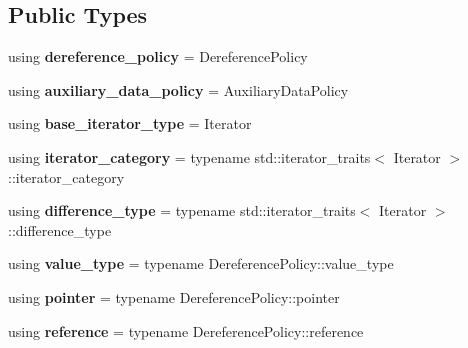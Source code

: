 \subsection*{Public Types}
\begin{DoxyCompactItemize}
\item 
\mbox{\label{classsequoia_1_1utilities_1_1iterator_ab53987191e27c9b1f33f4e916be8d9ef}} 
using {\bfseries dereference\+\_\+policy} = Dereference\+Policy
\item 
\mbox{\label{classsequoia_1_1utilities_1_1iterator_af01eea8a268f532dd72c984f17ed6c66}} 
using {\bfseries auxiliary\+\_\+data\+\_\+policy} = Auxiliary\+Data\+Policy
\item 
\mbox{\label{classsequoia_1_1utilities_1_1iterator_af167732549efba5d5db597e354ea22bc}} 
using {\bfseries base\+\_\+iterator\+\_\+type} = Iterator
\item 
\mbox{\label{classsequoia_1_1utilities_1_1iterator_a9cbb10816bfdac413573adf8802b2541}} 
using {\bfseries iterator\+\_\+category} = typename std\+::iterator\+\_\+traits$<$ Iterator $>$\+::iterator\+\_\+category
\item 
\mbox{\label{classsequoia_1_1utilities_1_1iterator_ae8566d56359d3fb113a678722e3f0409}} 
using {\bfseries difference\+\_\+type} = typename std\+::iterator\+\_\+traits$<$ Iterator $>$\+::difference\+\_\+type
\item 
\mbox{\label{classsequoia_1_1utilities_1_1iterator_a91306fff63b6a6212de3c4502ec130a5}} 
using {\bfseries value\+\_\+type} = typename Dereference\+Policy\+::value\+\_\+type
\item 
\mbox{\label{classsequoia_1_1utilities_1_1iterator_a27c145a1c5cd32253d28f938bba5a02c}} 
using {\bfseries pointer} = typename Dereference\+Policy\+::pointer
\item 
\mbox{\label{classsequoia_1_1utilities_1_1iterator_a3850721ed5fc458db2c1fc252a69f69d}} 
using {\bfseries reference} = typename Dereference\+Policy\+::reference
\end{DoxyCompactItemize}
